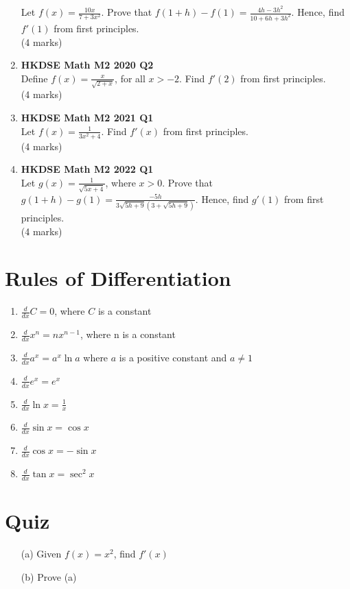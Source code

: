 \documentclass[12pt]{article}
\begin{document}
\begin{enumerate}
	Let $\displaystyle f(x) = \frac{10x}{7+3x^2}$. Prove that $f(1+h) - f(1) = \displaystyle\frac{4h-3h^2}{10+6h+3h^2}$. Hence, find  $f'(1)$ from first principles. \\(4 marks)
	\item \textbf{HKDSE Math M2 2020 Q2}\\
	Define $\displaystyle f(x) = \frac{x}{\sqrt{2+x}}$, for all $x > -2$. Find $f'(2)$ from first principles. \\(4 marks)
	\item \textbf{HKDSE Math M2 2021 Q1}\\
	Let $\displaystyle f(x) = \frac{1}{3x^{2}+4}$. Find $f'(x)$ from first principles. \\(4 marks)
	\item \textbf{HKDSE Math M2 2022 Q1}\\
	Let $\displaystyle g(x) = \frac{1}{\sqrt{5x+4}}$, where $x > 0$. Prove that $\displaystyle g(1+h)-g(1) = \frac{-5h}{3\sqrt{5h+9}(3+\sqrt{5h+9})}$. Hence, find $g'(1)$ from first principles. \\
	(4 marks)
\end{enumerate}




\section{Rules of Differentiation}
\begin{enumerate}
	\item $\displaystyle\frac{d}{dx}C = 0$, where $C$ is a constant
	\item $\displaystyle\frac{d}{dx}x^n = nx^{n-1}$, where n is a constant
	\item $\displaystyle\frac{d}{dx}a^x = a^x\ln{a}$ where $a$ is a positive constant and $a \neq 1$
	\item $\displaystyle\frac{d}{dx}e^{x} = e^{x}$
	\item $\displaystyle\frac{d}{dx}\ln{x} = \frac{1}{x}$
	\item $\displaystyle\frac{d}{dx}\sin{x} = \cos{x}$
	\item $\displaystyle\frac{d}{dx}\cos{x} = -\sin{x}$
	\item $\displaystyle\frac{d}{dx}\tan{x} = \sec^2{x}$
\end{enumerate}
\section{Quiz}
\begin{enumerate}
	\item [(a)] Given $f(x) = x^2$, find $f'(x)$
	\item [(b)] Prove (a)
\end{enumerate}
\end{document}
